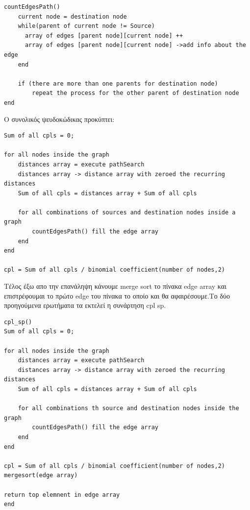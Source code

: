 \documentclass{article}
\begin{document}
\begin{lstlisting}
countEdgesPath()
	current node = destination node
	while(parent of current node != Source)
	  array of edges [parent node][current node] ++
	  array of edges [parent node][current node] ->add info about the edge
	end
	
	if (there are more than one parents for destination node)
		repeat the process for the other parent of destination node
end
\end{lstlisting}

Ο συνολικός ψευδοκώδικας προκύπτει:
\bigbreak
{}

\begin{lstlisting}
Sum of all cpls = 0;

for all nodes inside the graph
	distances array = execute pathSearch
	distances array -> distance array with zeroed the recurring distances
	Sum of all cpls = distances array + Sum of all cpls
	
	for all combinations of sources and destination nodes inside a graph
		countEdgesPath() fill the edge array
	end 
end

cpl = Sum of all cpls / binomial coefficient(number of nodes,2)
\end{lstlisting}\bigbreak
{}

Τέλος έξω απο την επανάληψη κάνουμε merge sort το πίνακα edge array και επιστρέφουμαι το πρώτο edge του πίνακα το οποίο και θα αφαιρέσουμε.Το δύο προηγούμενα ερωτήματα τα εκτελεί η συνάρτηση cpl sp.\pagebreak

\begin{lstlisting}
cpl_sp()
Sum of all cpls = 0;

for all nodes inside the graph
	distances array = execute pathSearch
	distances array -> distance array with zeroed the recurring distances
	Sum of all cpls = distances array + Sum of all cpls
	
	for all combinations th source and destination nodes inside the graph
		countEdgesPath() fill the edge array
	end 
end

cpl = Sum of all cpls / binomial coefficient(number of nodes,2)
mergesort(edge array)

return top elemnent in edge array
end
\end{lstlisting}\bigbreak
{}
\end{document}
